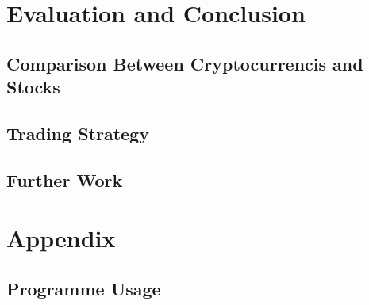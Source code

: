 \documentclass[11pt]{article} %
\theoremstyle{plain}
\theoremstyle{definition}
\begin{document}
\clearpage

\section{Evaluation and Conclusion}
\subsection{Comparison Between Cryptocurrencis and Stocks}
\subsection{Trading Strategy}
\subsection{Further Work}

\section{Appendix}
\subsection{Programme Usage}



\end{document}
